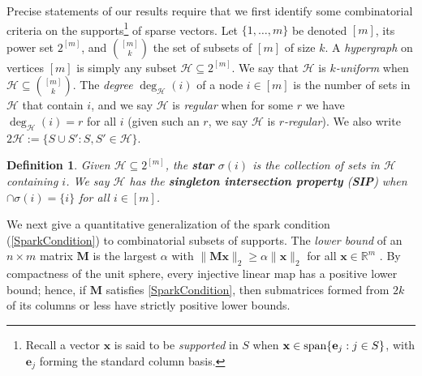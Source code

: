 \documentclass[journal, twocolumn]{IEEEtran}
\newtheorem{definition}{Definition}
\begin{document}

Precise statements of our results require that we first identify some combinatorial criteria on the supports\footnote{Recall a vector $\mathbf{x}$ is said to be \emph{supported} in $S$ when $\mathbf{x} \in \text{\rm span}\{\mathbf{e}_j: j\in S\}$, with $\mathbf{e}_j$ forming the standard column basis.} of sparse vectors. Let $\{1, \ldots, m\}$ be denoted $[m]$, its power set $2^{[m]}$, and ${[m] \choose k}$ the set of subsets of $[m]$ of size $k$.  A \emph{hypergraph} on vertices $[m]$  is simply any subset $\mathcal{H} \subseteq 2^{[m]}$. We say that $\mathcal{H}$ is \textit{$k$-uniform} when $\mathcal{H} \subseteq {[m] \choose k}$. The \emph{degree} $\deg_\mathcal{H}(i)$ of a node $i \in [m]$ is the number of sets in $\mathcal{H}$ that contain $i$, and we say $\mathcal{H}$ is \emph{regular} when for some $r$ we have $\deg_\mathcal{H}(i) = r$ for all $i$ (given such an $r$, we say $\mathcal{H}$ is \textit{$r$-regular}). We also write $2\mathcal{H} := \{ S \cup S': S, S' \in \mathcal{H}\}$.

\begin{definition}\label{sip}
Given $\mathcal{H} \subseteq 2^{[m]}$, the \textbf{star} $\sigma(i)$ is the collection of sets in $\mathcal{H}$ containing $i$. We say $\mathcal{H}$ has the \textbf{singleton intersection property} (\textbf{SIP}) when $\cap \sigma(i) = \{i\}$ for all $i \in [m]$. 
\end{definition}

We next give a quantitative generalization of the spark condition (\ref{SparkCondition}) to combinatorial subsets of supports. The \emph{lower bound} of an $n \times m$ matrix $\mathbf{M}$ is the largest $\alpha$ with \mbox{$\|\mathbf{M}\mathbf{x}\|_2 \geq \alpha\|\mathbf{x}\|_2$} for all $\mathbf{x} \in \mathbb{R}^m$ \cite{Grcar10}. By compactness of the unit sphere, every injective linear map has a positive lower bound; hence, if $\mathbf{M}$ satisfies \eqref{SparkCondition}, then submatrices formed from $2k$ of its columns or less have strictly positive lower bounds. 
\end{document}
